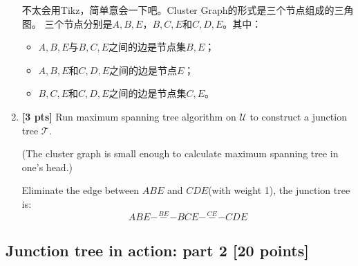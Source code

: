 \documentclass[12pt]{article}
\newcommand{\Ucal}{\mathcal{U}}
\newcommand{\Tcal}{\mathcal{T}}
\begin{document}
\begin{enumerate}
	      \begin{solution}
		      不太会用Tikz，简单意会一下吧。Cluster Graph的形式是三个节点组成的三角图。
		      三个节点分别是$A,B,E$，$B,C,E$和$C,D,E$。其中：
		      \begin{itemize}
			      \item $A,B,E$与$B,C,E$之间的边是节点集$B,E$；
			      \item $A,B,E$和$C,D,E$之间的边是节点$E$；
			      \item $B,C,E$和$C,D,E$之间的边是节点集$C,E$。
		      \end{itemize}
	      \end{solution}


	\item \textbf{[3 pts]} Run maximum spanning tree algorithm on $ \Ucal $ to construct a junction tree $ \Tcal $.

	      (The cluster graph is small enough to calculate maximum spanning tree in one's head.)

	      \begin{solution}
		      Eliminate the edge between $ABE$ and $CDE$(with weight 1), the junction tree is:
		      \begin{equation}
			      ABE \overset{BE}{---} BCE \overset{CE}{---} CDE \nonumber
		      \end{equation}
	      \end{solution}
\end{enumerate}



\subsection{Junction tree in action: part 2 [20 points]}
\end{document}
